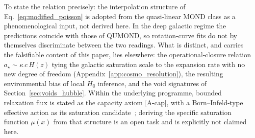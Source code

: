   To state the relation precisely: the interpolation structure of
  Eq.~\eqref{eq:modified_poisson} is adopted from the quasi-linear MOND
  class as a phenomenological input, not derived here.
  In the deep galactic regime the predictions coincide with those of QUMOND,
  so rotation-curve fits do not by themselves discriminate between the two
  readings.
  What is distinct, and carries the falsifiable content of this paper, lies
  elsewhere: the operational-closure relation $a_\star \sim \kappa\,c\,H(z)$
  tying the galactic saturation scale to the expansion rate with no new
  degree of freedom (Appendix~\ref{app:cosmo_resolution}), the resulting
  environmental bias of local $H_0$ inference, and the void signatures of
  Section~\ref{sec:voids_hubble}.
  Within the underlying programme, bounded relaxation flux is stated as the
  capacity axiom [A-cap], with a Born--Infeld-type effective action as its
  saturation candidate~\cite{Beau2026c}; deriving the specific saturation
  function $\mu(x)$ from that structure is an open task and is explicitly
  not claimed here.
